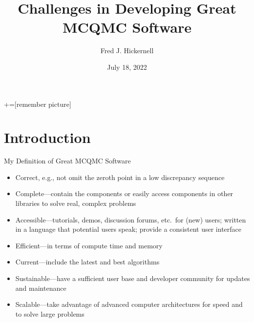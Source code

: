 \documentclass[11pt,compress,xcolor={usenames,dvipsnames},aspectratio=169]{beamer}
\title{Challenges in Developing Great MCQMC Software}
\author[]{Fred J. Hickernell}
\institute{Department of Applied Mathematics \&
	Center for Interdisciplinary Scientific Computation \\  Illinois Institute of Technology \quad
	\href{mailto:hickernell@iit.edu}{\url{hickernell@iit.edu}} \quad
	\href{http://mypages.iit.edu/~hickernell}{\url{mypages.iit.edu/~hickernell}}}
\date[]{July 18, 2022}
\begin{document}
	+=[remember picture]
	\everymath{\displaystyle}

\frame{\titlepage}


\section{Introduction}

\begin{frame}{My Definition of Great MCQMC Software}
	
	\vspace{-5ex}
	\begin{itemize}
		\item \alert{Correct}, e.g., not omit the zeroth point in a low discrepancy sequence \parencite{Owe22a, scipySobol2020a}
	
		\item  \alert{Complete}---contain the components or  easily access components in other libraries to solve real, complex problems
		
		\item  \alert{Accessible}---tutorials, demos, discussion forums, etc.\ for (new) users; written in a language that potential users speak; provide a consistent user interface
		
		\item \alert{Efficient}---in terms of compute time and memory
				
		\item \alert{Current}---include the latest and best algorithms

		\item  \alert{Sustainable}---have a sufficient user base and developer community for updates and maintenance
		
		\item \alert{Scalable}---take advantage of advanced computer architectures for speed and to solve large problems
		
	\end{itemize}
\end{frame}
\end{document}
